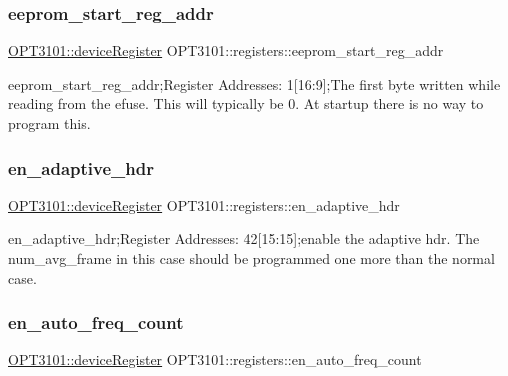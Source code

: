 \subsubsection{\texorpdfstring{eeprom\+\_\+start\+\_\+reg\+\_\+addr}{eeprom\_start\_reg\_addr}}
{\footnotesize\ttfamily \mbox{\hyperlink{class_o_p_t3101_1_1device_register}{O\+P\+T3101\+::device\+Register}} O\+P\+T3101\+::registers\+::eeprom\+\_\+start\+\_\+reg\+\_\+addr}



eeprom\+\_\+start\+\_\+reg\+\_\+addr;Register Addresses\+: 1\mbox{[}16\+:9\mbox{]};The first byte written while reading from the efuse. This will typically be 0. At startup there is no way to program this. 

\mbox{\label{class_o_p_t3101_1_1registers_ab14fd3da3a7aee59227f3a0b2c6ed653}} 
\subsubsection{\texorpdfstring{en\+\_\+adaptive\+\_\+hdr}{en\_adaptive\_hdr}}
{\footnotesize\ttfamily \mbox{\hyperlink{class_o_p_t3101_1_1device_register}{O\+P\+T3101\+::device\+Register}} O\+P\+T3101\+::registers\+::en\+\_\+adaptive\+\_\+hdr}



en\+\_\+adaptive\+\_\+hdr;Register Addresses\+: 42\mbox{[}15\+:15\mbox{]};enable the adaptive hdr. The num\+\_\+avg\+\_\+frame in this case should be programmed one more than the normal case. 

\mbox{\label{class_o_p_t3101_1_1registers_a1c8bf1bb8f6d672bf780e5f99698959d}} 
\subsubsection{\texorpdfstring{en\+\_\+auto\+\_\+freq\+\_\+count}{en\_auto\_freq\_count}}
{\footnotesize\ttfamily \mbox{\hyperlink{class_o_p_t3101_1_1device_register}{O\+P\+T3101\+::device\+Register}} O\+P\+T3101\+::registers\+::en\+\_\+auto\+\_\+freq\+\_\+count}



